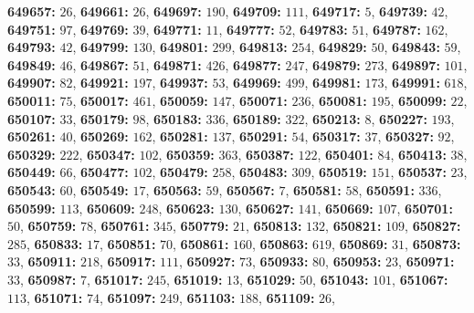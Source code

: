 \textsf{\bfseries 649657:} $26$, \textsf{\bfseries 649661:} $26$, \textsf{\bfseries 649697:} $190$, \textsf{\bfseries 649709:} $111$, \textsf{\bfseries 649717:} $5$, \textsf{\bfseries 649739:} $42$, \textsf{\bfseries 649751:} $97$, \textsf{\bfseries 649769:} $39$, \textsf{\bfseries 649771:} $11$, \textsf{\bfseries 649777:} $52$, \textsf{\bfseries 649783:} $51$, \textsf{\bfseries 649787:} $162$, \textsf{\bfseries 649793:} $42$, \textsf{\bfseries 649799:} $130$, \textsf{\bfseries 649801:} $299$, \textsf{\bfseries 649813:} $254$, \textsf{\bfseries 649829:} $50$, \textsf{\bfseries 649843:} $59$, \textsf{\bfseries 649849:} $46$, \textsf{\bfseries 649867:} $51$, \textsf{\bfseries 649871:} $426$, \textsf{\bfseries 649877:} $247$, \textsf{\bfseries 649879:} $273$, \textsf{\bfseries 649897:} $101$, \textsf{\bfseries 649907:} $82$, \textsf{\bfseries 649921:} $197$, \textsf{\bfseries 649937:} $53$, \textsf{\bfseries 649969:} $499$, \textsf{\bfseries 649981:} $173$, \textsf{\bfseries 649991:} $618$, \textsf{\bfseries 650011:} $75$, \textsf{\bfseries 650017:} $461$, \textsf{\bfseries 650059:} $147$, \textsf{\bfseries 650071:} $236$, \textsf{\bfseries 650081:} $195$, \textsf{\bfseries 650099:} $22$, \textsf{\bfseries 650107:} $33$, \textsf{\bfseries 650179:} $98$, \textsf{\bfseries 650183:} $336$, \textsf{\bfseries 650189:} $322$, \textsf{\bfseries 650213:} $8$, \textsf{\bfseries 650227:} $193$, \textsf{\bfseries 650261:} $40$, \textsf{\bfseries 650269:} $162$, \textsf{\bfseries 650281:} $137$, \textsf{\bfseries 650291:} $54$, \textsf{\bfseries 650317:} $37$, \textsf{\bfseries 650327:} $92$, \textsf{\bfseries 650329:} $222$, \textsf{\bfseries 650347:} $102$, \textsf{\bfseries 650359:} $363$, \textsf{\bfseries 650387:} $122$, \textsf{\bfseries 650401:} $84$, \textsf{\bfseries 650413:} $38$, \textsf{\bfseries 650449:} $66$, \textsf{\bfseries 650477:} $102$, \textsf{\bfseries 650479:} $258$, \textsf{\bfseries 650483:} $309$, \textsf{\bfseries 650519:} $151$, \textsf{\bfseries 650537:} $23$, \textsf{\bfseries 650543:} $60$, \textsf{\bfseries 650549:} $17$, \textsf{\bfseries 650563:} $59$, \textsf{\bfseries 650567:} $7$, \textsf{\bfseries 650581:} $58$, \textsf{\bfseries 650591:} $336$, \textsf{\bfseries 650599:} $113$, \textsf{\bfseries 650609:} $248$, \textsf{\bfseries 650623:} $130$, \textsf{\bfseries 650627:} $141$, \textsf{\bfseries 650669:} $107$, \textsf{\bfseries 650701:} $50$, \textsf{\bfseries 650759:} $78$, \textsf{\bfseries 650761:} $345$, \textsf{\bfseries 650779:} $21$, \textsf{\bfseries 650813:} $132$, \textsf{\bfseries 650821:} $109$, \textsf{\bfseries 650827:} $285$, \textsf{\bfseries 650833:} $17$, \textsf{\bfseries 650851:} $70$, \textsf{\bfseries 650861:} $160$, \textsf{\bfseries 650863:} $619$, \textsf{\bfseries 650869:} $31$, \textsf{\bfseries 650873:} $33$, \textsf{\bfseries 650911:} $218$, \textsf{\bfseries 650917:} $111$, \textsf{\bfseries 650927:} $73$, \textsf{\bfseries 650933:} $80$, \textsf{\bfseries 650953:} $23$, \textsf{\bfseries 650971:} $33$, \textsf{\bfseries 650987:} $7$, \textsf{\bfseries 651017:} $245$, \textsf{\bfseries 651019:} $13$, \textsf{\bfseries 651029:} $50$, \textsf{\bfseries 651043:} $101$, \textsf{\bfseries 651067:} $113$, \textsf{\bfseries 651071:} $74$, \textsf{\bfseries 651097:} $249$, \textsf{\bfseries 651103:} $188$, \textsf{\bfseries 651109:} $26$, 
